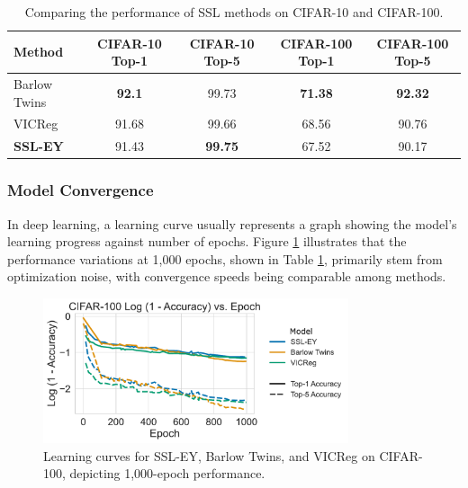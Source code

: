 \begin{table}[H]
    \centering
    \begin{tabular}{|l|c|c|c|c|}
        \hline
        Method          & CIFAR-10 Top-1 & CIFAR-10 Top-5 & CIFAR-100 Top-1 & CIFAR-100 Top-5 \\
        \hline
        Barlow Twins    & \textbf{92.1}  & 99.73          & \textbf{71.38}  & \textbf{92.32}  \\
        VICReg          & 91.68          & 99.66          & 68.56           & 90.76           \\
        \textbf{SSL-EY} & 91.43          & \textbf{99.75} & 67.52           & 90.17           \\
        \hline
    \end{tabular}
    \caption{Comparing the performance of SSL methods on CIFAR-10 and CIFAR-100.}
    \label{tab:selfsup}
\end{table}

\subsubsection{Model Convergence} In deep learning, a learning curve usually represents a graph showing the model's learning progress against number of epochs.
Figure \ref{fig:ssl_learning_curve_cifar100_top5} illustrates that the performance variations at 1,000 epochs, shown in Table \ref{tab:selfsup}, primarily stem from optimization noise, with convergence speeds being comparable among methods.

\begin{figure}[H]
    \centering
    \includegraphics[width=0.8\textwidth]{figures/SSL/cifar100_learning_curve_log_error}
    \caption{Learning curves for SSL-EY, Barlow Twins, and VICReg on CIFAR-100, depicting 1,000-epoch performance.}
    \label{fig:ssl_learning_curve_cifar100_top5}
\end{figure}

